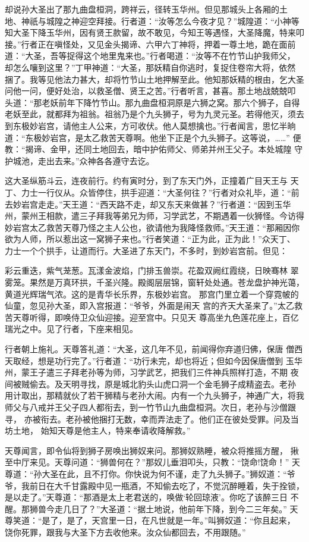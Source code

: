 却说孙大圣出了那九曲盘桓洞，跨祥云，径转玉华州。但见那城头上各厢的土
地、神祇与城隍之神迎空拜接。行者道：“汝等怎么今夜才见？”城隍道：“小神等
知大圣下降玉华州，因有贤王款留，故不敢见，今知王等遇怪，大圣降魔，特来叩
接。”行者正在嗔怪处，又见金头揭谛、六甲六丁神将，押着一尊土地，跪在面前
道：“大圣，吾等捉得这个地里鬼来也。”行者喝道：“汝等不在竹节山护我师父，
却怎么嚷到这里？”丁甲神道：“大圣，那妖精自你逃时，复捉住卷帘大将，依然
捆了。我等见他法力甚大，却将竹节山土地押解至此。他知那妖精的根由，乞大圣
问他一问，便好处治，以救圣僧、贤王之苦。”行者听言，甚喜。那土地战兢兢叩
头道：“那老妖前年下降竹节山。那九曲盘桓洞原是六狮之窝。那六个狮子，自得
老妖至此，就都拜为祖翁。祖翁乃是个九头狮子，号为九灵元圣。若得他灭，须去
到东极妙岩宫，请他主人公来，方可收伏。他人莫想擒也。”行者闻言，思忆半晌
道：“东极妙岩宫，是太乙救苦天尊啊。他坐下正是个九头狮子。这等说，……”
便教：“揭谛、金甲，还同土地回去，暗中护佑师父、师弟并州王父子。本处城隍
守护城池，走出去来。”众神各各遵守去讫。

这大圣纵筋斗云，连夜前行。约有寅时分，到了东天门外，正撞着广目天王与
天丁、力士一行仪从。众皆停住，拱手迎道：“大圣何往？”行者对众礼毕，道：“前
去妙岩宫走走。”天王道：“西天路不走，却又东天来做甚？”行者道：“因到玉华
州，蒙州王相款，遣三子拜我等弟兄为师，习学武艺，不期遇着一伙狮怪。今访得
妙岩宫太乙救苦天尊乃怪之主人公也，欲请他为我降怪救师。”天王道：“那厢因你
欲为人师，所以惹出这一窝狮子来也。”行者笑道：“正为此，正为此！”众天丁、
力士一个个拱手，让道而行。大圣进了东天门，不多时，到妙岩宫前。但见：

彩云重迭，紫气茏葱。瓦漾金波焰，门排玉兽崇。花盈双阙红霞绕，日映骞林
翠雾笼。果然是万真环拱，千圣兴隆。殿阁层层锦，窗轩处处通。苍龙盘护神光蔼，
黄道光辉瑞气浓。这的是青华长乐界，东极妙岩宫。
那宫门里立着一个穿霓帔的仙童，忽见孙大圣，即入宫报道：“爷爷，外面是闹天
宫的齐天大圣来了。”太乙救苦天尊听得，即唤侍卫众仙迎接。迎至宫中。只见天
尊高坐九色莲花座上，百亿瑞光之中。见了行者，下座来相见。

行者朝上施礼。天尊答礼道：“大圣，这几年不见，前闻得你弃道归佛，保唐
僧西天取经，想是功行完了。”行者道：“功行未完，却也将近；但如今因保唐僧到
玉华州，蒙王子遣三子拜老孙等为师，习学武艺，把我们三件神兵照样打造，不期
夜间被贼偷去。及天明寻找，原是城北豹头山虎口洞一个金毛狮子成精盗去。老孙
用计取出，那精就伙了若干狮精与老孙大闹。内有一个九头狮子，神通广大，将我
师父与八戒并王父子四人都衔去，到一竹节山九曲盘桓洞。次日，老孙与沙僧跟寻，
亦被衔去。老孙被他捆打无数，幸而弄法走了。他们正在彼处受罪。问及当坊土地，
始知天尊是他主人，特来奉请收降解救。”

天尊闻言，即令仙将到狮子房唤出狮奴来问。那狮奴熟睡，被众将推摇方醒，
揪至中厅来见。天尊问道：“狮兽何在？”那奴儿垂泪叩头，只教：“饶命!饶命！”
天尊道：“孙大圣在此，且不打你。你快说为何不谨，走了九头狮子。”狮奴道：“爷
爷，我前日在大千甘露殿中见一瓶酒，不知偷去吃了，不觉沉醉睡着，失于拴锁，
是以走了。”天尊道：“那酒是太上老君送的，唤做‘轮回琼液’。你吃了该醉三日
不醒。那狮兽今走几日了？”大圣道：“据土地说，他前年下降，到今二三年矣。”
天尊笑道：“是了，是了，天宫里一日，在凡世就是一年。”叫狮奴道：“你且起来，
饶你死罪，跟我与大圣下方去收他来。汝众仙都回去，不用跟随。”

